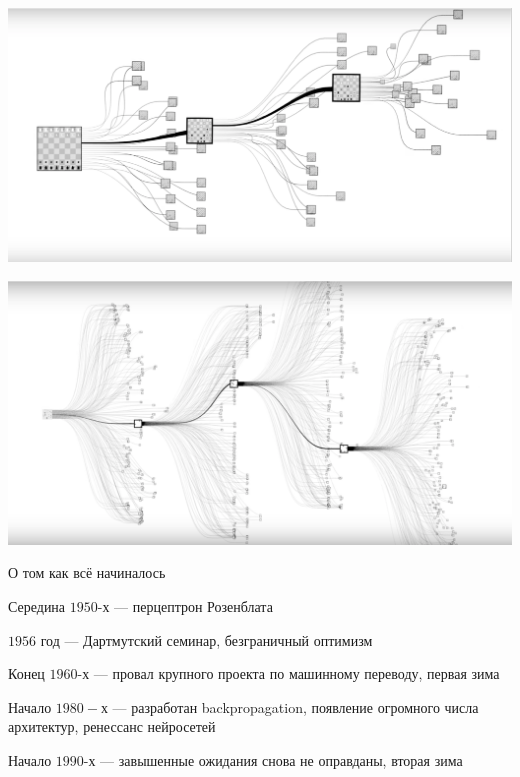 \documentclass[notes,12pt, aspectratio=169]{beamer}
\newenvironment{wideitemize}{\itemize\addtolength{\itemsep}{10pt}}{\enditemize}
\begin{document}
\begin{frame}
\begin{center}
	\includegraphics[width=.9\linewidth]{chees_3.png}
\end{center}
\end{frame}


\begin{frame}
\begin{center}
	\includegraphics[width=.9\linewidth]{chess_4.png}
\end{center}
\end{frame}


\begin{frame}{О том как всё начиналось}
\begin{wideitemize}
	
	\item<1->  Середина $1950$-х — перцептрон Розенблата 
	
	\item<2-> $1956$ год — Дартмутский семинар, безграничный оптимизм
	
	\item<3->  Конец $1960$-х — провал крупного проекта по машинному переводу, первая зима 
	
	\item<4-> Начало $1980-$х —  разработан backpropagation, появление огромного числа архитектур, ренессанс нейросетей 
	
	\item<5->  Начало $1990$-х — завышенные ожидания снова не оправданы, вторая зима
	
\end{wideitemize}
\end{frame}
\end{document}
